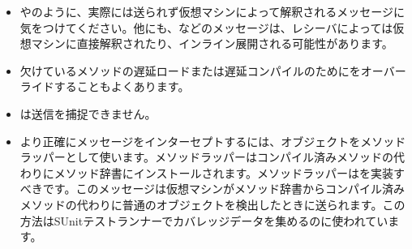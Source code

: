 \documentclass[a4paper,10pt,twoside]{book}
\begin{document}
\begin{itemize}
\item {}やのように、実際には送られず仮想マシンによって解釈されるメッセージに気をつけてください。他にも\ct{+}\ct{-}、などのメッセージは、レシーバによっては仮想マシンに直接解釈されたり、インライン展開される可能性があります。
\item 欠けているメソッドの遅延ロードまたは遅延コンパイルのためにをオーバーライドすることもよくあります。
\item {}は\self 送信を捕捉できません。
\item より正確にメッセージをインターセプトするには、オブジェクトをメソッドラッパーとして使います。メソッドラッパーはコンパイル済みメソッドの代わりにメソッド辞書にインストールされます。メソッドラッパーはを実装すべきです。このメッセージは仮想マシンがメソッド辞書からコンパイル済みメソッドの代わりに普通のオブジェクトを検出したときに送られます。この方法はSUnitテストランナーでカバレッジデータを集めるのに使われています。
\end{itemize}

\ifx\wholebook\relax\else
   
   
\end{document}
